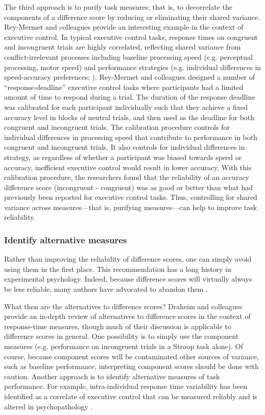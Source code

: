 \documentclass[a4paper,notitlepage,12pt]{article}
\begin{document}
The third approach is to purify task measures; that is, to decorrelate the components of a difference score by reducing or eliminating their shared variance. Rey-Mermet and colleagues \cite{rey2019executive} provide an interesting example in the context of executive control. In typical executive control tasks, response times on congruent and incongruent trials are highly correlated, reflecting shared variance from conflict-irrelevant processes including baseline processing speed (e.g. perceptual processing, motor speed) and performance strategies (e.g. individual differences in speed-accuracy preferences; \cite{draheim2019reaction}). Rey-Mermet and colleagues designed a number of ``response-deadline'' executive control tasks where participants had a limited amount of time to respond during a trial. The duration of the response deadline was calibrated for each participant individually such that they achieve a fixed accuracy level in blocks of neutral trials, and  then used as the deadline for both congruent and incongruent trials. The calibration procedure controls for individual differences in processing speed that contribute to performance in both congruent and incongruent trials. It also controls for individual differences in strategy, as regardless of whether a participant was biased towards speed or accuracy, inefficient executive control would result in lower accuracy. With this calibration procedure, the researchers found that the reliability of an accuracy difference score (incongruent - congruent) was as good or better than what had previously been reported for executive control tasks. Thus, controlling for shared variance across measures---that is, purifying measures---can help to improve task reliability.

\subsubsection{Identify alternative measures}

Rather than improving the reliability of difference scores, one can simply avoid using them in the first place. This recommendation has a long history in experimental psychology. Indeed, because difference scores will virtually always be less reliable, many authors have advocated to abandon them \cite{lord1956measurement, cronbach1970we, edwards2001ten}. 

What then are the alternatives to difference scores? Draheim and colleagues \cite{draheim2019reaction} provide an in-depth review of alternatives to difference scores in the context of response-time measures, though much of their discussion is applicable to difference scores in general. One possibility is to simply use the component measures (e.g. performance on incongruent trials in a Stroop task alone). Of course, because component scores will be contaminated other sources of variance, such as baseline performance, interpreting component scores should be done with caution. Another approach is to identify alternative measures of task performance. For example, intra-individual response time variability has been identified as a correlate of executive control that can be measured reliably \cite{saville2011stability} and is altered in psychopathology \cite{kofler2013reaction}. 
\end{document}
